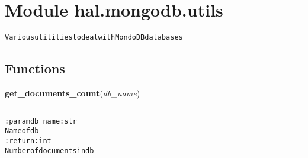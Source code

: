 %
%
%


\section{Module hal.mongodb.utils}

    \label{hal:mongodb:utils}
\begin{alltt}
Various utilities to deal with MondoDB databases 
\end{alltt}



  \subsection{Functions}

    \label{hal:mongodb:utils:get_documents_count}

    \vspace{0.5ex}

\hspace{.8\funcindent}\begin{boxedminipage}{\funcwidth}

    \raggedright \textbf{get\_documents\_count}(\textit{db\_name})

    \vspace{-1.5ex}

    \rule{\textwidth}{0.5\fboxrule}
\setlength{\parskip}{2ex}
\begin{alltt}

:param db\_name: str
    Name of db
:return: int
    Number of documents in db
\end{alltt}

\setlength{\parskip}{1ex}
    \end{boxedminipage}

